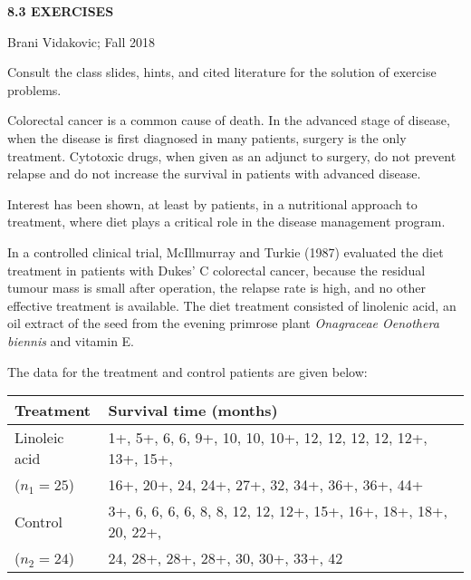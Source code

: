 \documentclass[12pt]{article}
\begin{document}
\thispagestyle{empty}
\vspace*{-0.1in}

\begin{center}
        { \Large \bf   8.3 EXERCISES}
\end{center}

\noindent  Brani  Vidakovic;  Fall 2018


\noindent Consult the class slides, hints, and  cited literature for
the solution of exercise problems.

\vspace{0.5in}



\vspace*{0.2in}
%
 Colorectal cancer is a common cause of death. In the advanced
stage of disease, when the disease is first diagnosed in many patients,
surgery is the only  treatment. Cytotoxic drugs,
when given as an adjunct to surgery,  do not prevent
relapse and do not increase the survival
in patients with advanced disease.

 Interest has been shown, at least by patients, in a nutritional
approach to treatment,
where diet plays a critical role in the disease management program.


 In a controlled clinical trial, McIllmurray  and  Turkie (1987)
  evaluated the diet treatment in patients with Dukes' C
colorectal cancer, because the residual tumour mass is small after operation,
the relapse rate is high, and no other effective treatment is available.
The diet treatment consisted of  linolenic
acid, an oil extract of the seed from
the evening primrose plant  {\it Onagraceae Oenothera biennis}   and vitamin E.

The data for the treatment  and control  patients are given below:

\begin{center}
\begin{tabular}{ll}
\hline
Treatment	& Survival time (months)\\
\hline
  Linoleic acid  &	1+, 5+, 6, 6, 9+, 10, 10, 10+, 12, 12, 12, 12, 12+, 13+, 15+,\\
 ($n_1=25$)    & 16+, 20+, 24, 24+, 27+, 32, 34+, 36+, 36+, 44+\\
  \hline
Control  &	3+, 6, 6, 6, 6, 8, 8, 12, 12, 12+, 15+, 16+, 18+, 18+, 20, 22+,\\
 ($n_2=24$)   & 24, 28+, 28+, 28+, 30, 30+, 33+, 42\\
\hline
\end{tabular}
\end{center}
\end{document}

